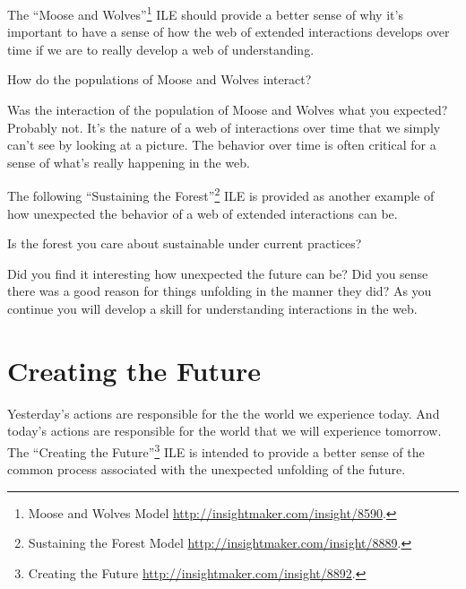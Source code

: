 \documentclass[]{memoir}
\begin{document}
The ``Moose and Wolves''\footnote{Moose and Wolves Model
  \url{http://insightmaker.com/insight/8590}.} ILE should provide a
better sense of why it's important to have a sense of how the web of
extended interactions develops over time if we are to really develop a
web of understanding.

\FloatBarrier 

\begin{model}[frametitle={Model: Moose and Wolves}] 

 How do the populations of Moose and Wolves interact?




 \end{model}

Was the interaction of the population of Moose and Wolves what you
expected? Probably not. It's the nature of a web of interactions over
time that we simply can't see by looking at a picture. The behavior over
time is often critical for a sense of what's really happening in the
web.

The following ``Sustaining the Forest''\footnote{Sustaining the Forest
  Model \url{http://insightmaker.com/insight/8889}.} ILE is provided as
another example of how unexpected the behavior of a web of extended
interactions can be.

\FloatBarrier 

\begin{model}[frametitle={Model: Sustaining the Forest}] 

 Is the forest you care about sustainable under current practices?




 \end{model}

Did you find it interesting how unexpected the future can be? Did you
sense there was a good reason for things unfolding in the manner they
did? As you continue you will develop a skill for understanding
interactions in the web.

\section{Creating the Future}

Yesterday's actions are responsible for the the world we experience
today. And today's actions are responsible for the world that we will
experience tomorrow. The ``Creating the Future''\footnote{Creating the
  Future \url{http://insightmaker.com/insight/8892}.} ILE is intended to
provide a better sense of the common process associated with the
unexpected unfolding of the future.
\end{document}
